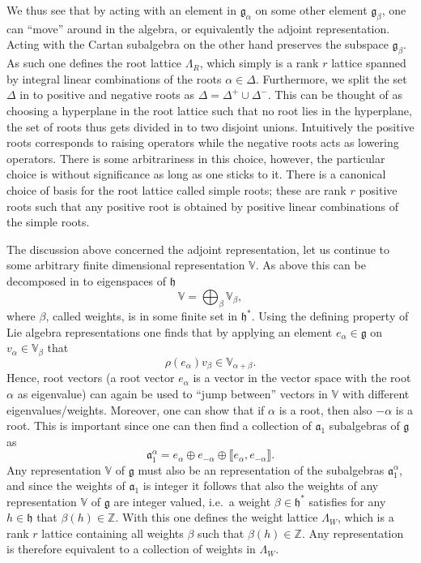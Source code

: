 We thus see that by acting with an element in $\mathfrak{g}_\alpha$ on some other element $\mathfrak{g}_\beta$, one can ``move'' around in the algebra, or equivalently the adjoint representation. Acting with the Cartan subalgebra on the other hand preserves the subspace $\mathfrak{g}_\beta$. As such one defines the root lattice $\Lambda_R$, which simply is a rank $r$ lattice spanned by integral linear combinations of the roots $\alpha\in\Delta$. Furthermore, we split the set $\Delta$ in to positive and negative roots as $\Delta = \Delta^+\cup\Delta^-$. This can be thought of as choosing a hyperplane in the root lattice such that no root lies in the hyperplane, the set of roots thus gets divided in to two disjoint unions. Intuitively the positive roots corresponds to raising operators while the negative roots acts as lowering operators. There is some arbitrariness in this choice, however, the particular choice is without significance as long as one sticks to it. There is a canonical choice of basis for the root lattice called simple roots; these are rank $r$ positive roots such that any positive root is obtained by positive linear combinations of the simple roots. 

The discussion above concerned the adjoint representation, let us continue to some arbitrary finite dimensional representation $\mathbb{V}$. As above this can be decomposed in to eigenspaces of $\mathfrak{h}$
\begin{equation}
    \mathbb{V} = \bigoplus_\beta \mathbb{V}_\beta,
\end{equation}
where $\beta$, called weights, is in some finite set in $\mathfrak{h}^*$. Using the defining property of Lie algebra representations one finds that by applying an element $e_\alpha\in\mathfrak{g}$ on $v_\alpha\in\mathbb{V}_\beta$ that 
\begin{equation}
    \rho(e_\alpha)v_\beta \in \mathbb{V}_{\alpha+\beta}.
\end{equation}
Hence, root vectors (a root vector $e_\alpha$ is a vector in the vector space with the root $\alpha$ as eigenvalue) can again be used to ``jump between'' vectors in $\mathbb{V}$ with different eigenvalues/weights. Moreover, one can show that if $\alpha$ is a root, then also $-\alpha$ is a root. This is important since one can then find a collection of $\mathfrak{a}_1$ subalgebras of $\mathfrak{g}$ as 
\begin{equation}
    \mathfrak{a}_1^\alpha = e_\alpha \oplus e_{-\alpha} \oplus \llbracket e_\alpha,e_{-\alpha}\rrbracket.
\end{equation}
Any representation $\mathbb{V}$ of $\mathfrak{g}$ must also be an representation of the subalgebras $\mathfrak{a}_1^\alpha$, and since the weights of $\mathfrak{a}_1$ is integer it follows that also the weights of any representation $\mathbb{V}$ of $\mathfrak{g}$ are integer valued, i.e.\ a weight $\beta\in\mathfrak{h}^*$ satisfies for any $h\in\mathfrak{h}$ that $\beta(h)\in\mathbb{Z}$. With this one defines the weight lattice $\Lambda_W$, which is a rank $r$ lattice containing all weights $\beta$ such that $\beta(h)\in\mathbb{Z}$. Any representation is therefore equivalent to a collection of weights in $\Lambda_W$. 

